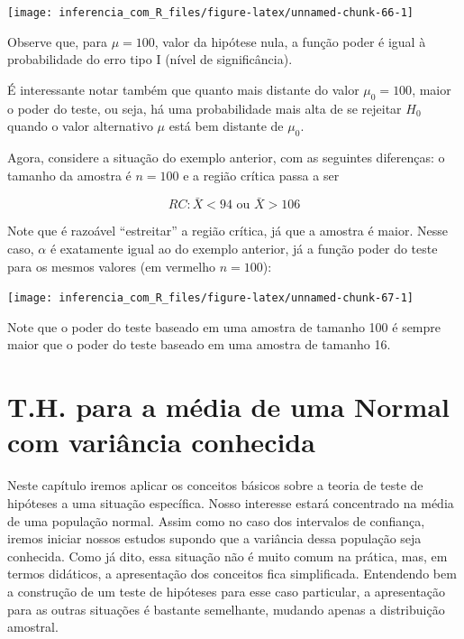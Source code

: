 \documentclass[
]{book}
\begin{document}
\begin{center}\texttt{[image: inferencia\_com\_R\_files/figure-latex/unnamed-chunk-66-1]} \end{center}

Observe que, para \(\mu=100\), valor da hipótese nula, a função poder é igual à probabilidade do erro tipo I (nível de significância).

É interessante notar também que quanto mais distante do valor \(\mu_0=100\), maior o poder do teste, ou seja, há uma probabilidade mais alta de se rejeitar \(H_0\) quando o valor alternativo \(\mu\) está bem distante de \(\mu_0\).

Agora, considere a situação do exemplo anterior, com as seguintes diferenças: o tamanho da amostra é \(n=100\) e a região crítica passa a ser

\[RC: \bar X < 94\text{ ou }\bar X > 106\]

Note que é razoável ``estreitar'' a região crítica, já que a amostra é maior. Nesse caso, \(\alpha\) é exatamente igual ao do exemplo anterior, já a função poder do teste para os mesmos valores (em vermelho \(n=100\)):

\begin{center}\texttt{[image: inferencia\_com\_R\_files/figure-latex/unnamed-chunk-67-1]} \end{center}

Note que o poder do teste baseado em uma amostra de tamanho 100 é sempre maior que o poder do teste baseado em uma amostra de tamanho 16.

\hypertarget{t.h.-para-a-muxe9dia-de-uma-normal-com-variuxe2ncia-conhecida}{%
\section{T.H. para a média de uma Normal com variância conhecida}\label{t.h.-para-a-muxe9dia-de-uma-normal-com-variuxe2ncia-conhecida}}

Neste capítulo iremos aplicar os conceitos básicos sobre a teoria de teste de hipóteses a uma situação específica. Nosso interesse estará concentrado na média de uma população normal. Assim como no caso dos intervalos de confiança, iremos iniciar nossos estudos supondo que a variância dessa população seja conhecida. Como já dito, essa situação não é muito comum na prática, mas, em termos didáticos, a apresentação dos conceitos fica simplificada. Entendendo bem a construção de um teste de hipóteses para esse caso particular, a apresentação para as outras situações é bastante semelhante, mudando apenas a distribuição amostral.
\end{document}
